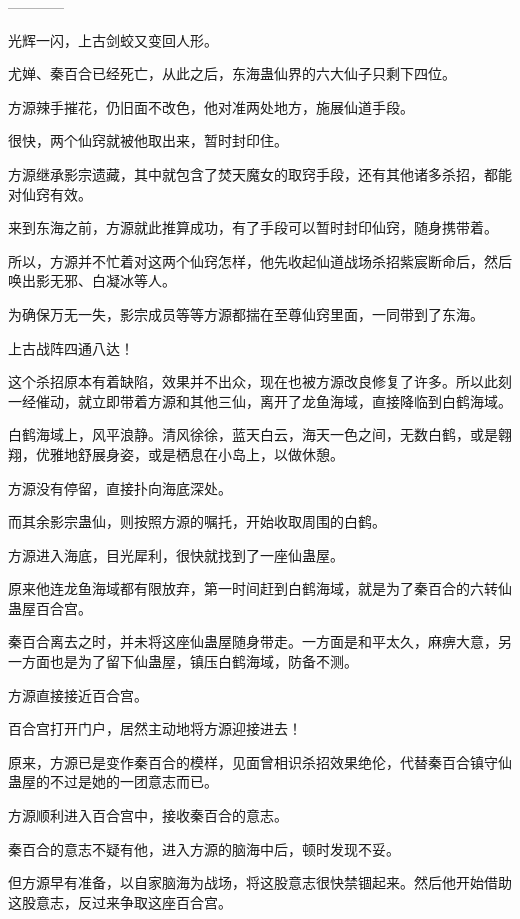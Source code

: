 
\begin{this_body}

------------

光辉一闪，上古剑蛟又变回人形。

尤婵、秦百合已经死亡，从此之后，东海蛊仙界的六大仙子只剩下四位。

方源辣手摧花，仍旧面不改色，他对准两处地方，施展仙道手段。

很快，两个仙窍就被他取出来，暂时封印住。

方源继承影宗遗藏，其中就包含了焚天魔女的取窍手段，还有其他诸多杀招，都能对仙窍有效。

来到东海之前，方源就此推算成功，有了手段可以暂时封印仙窍，随身携带着。

所以，方源并不忙着对这两个仙窍怎样，他先收起仙道战场杀招紫宸断命后，然后唤出影无邪、白凝冰等人。

为确保万无一失，影宗成员等等方源都揣在至尊仙窍里面，一同带到了东海。

上古战阵四通八达！

这个杀招原本有着缺陷，效果并不出众，现在也被方源改良修复了许多。所以此刻一经催动，就立即带着方源和其他三仙，离开了龙鱼海域，直接降临到白鹤海域。

白鹤海域上，风平浪静。清风徐徐，蓝天白云，海天一色之间，无数白鹤，或是翱翔，优雅地舒展身姿，或是栖息在小岛上，以做休憩。

方源没有停留，直接扑向海底深处。

而其余影宗蛊仙，则按照方源的嘱托，开始收取周围的白鹤。

方源进入海底，目光犀利，很快就找到了一座仙蛊屋。

原来他连龙鱼海域都有限放弃，第一时间赶到白鹤海域，就是为了秦百合的六转仙蛊屋百合宫。

秦百合离去之时，并未将这座仙蛊屋随身带走。一方面是和平太久，麻痹大意，另一方面也是为了留下仙蛊屋，镇压白鹤海域，防备不测。

方源直接接近百合宫。

百合宫打开门户，居然主动地将方源迎接进去！

原来，方源已是变作秦百合的模样，见面曾相识杀招效果绝伦，代替秦百合镇守仙蛊屋的不过是她的一团意志而已。

方源顺利进入百合宫中，接收秦百合的意志。

秦百合的意志不疑有他，进入方源的脑海中后，顿时发现不妥。

但方源早有准备，以自家脑海为战场，将这股意志很快禁锢起来。然后他开始借助这股意志，反过来争取这座百合宫。


\end{this_body}
